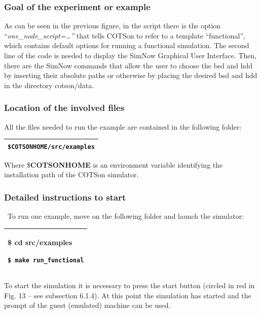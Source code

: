 \documentclass[a4paper]{article}
\begin{document}
\subsubsection[Goal of the experiment or example]{\rmfamily Goal of the
experiment or example}
{
As can be seen in the previous figure, in the script there is the option
{\textquotedblleft}\textit{one\_node\_script={\dots}{\textquotedblright}}
that tells COTSon to refer to a template
{\textquotedblleft}functional{\textquotedblright}, which contains
default options for running a functional simulation. The second line of
the code is needed to display the SimNow Graphical User Interface.
Then, there are the SimNow commands that allow the user to choose the
bsd and hdd by inserting their absolute paths or otherwise by placing
the desired bsd and hdd in the directory cotson/data.}

\subsubsection[Location of the involved files]{\rmfamily Location of the
involved files}
{
All the files needed to run the example are contained in the following
folder:}

\begin{flushleft}
\tablehead{}
\begin{supertabular}{|m{6.21846in}|}
\hline
{}
\texttt{\$COTSONHOME}\foreignlanguage{english}{\texttt{/src/examples}}\\\hline
\end{supertabular}
\end{flushleft}
{
Where \$\textbf{COTSONHOME }is an environment variable identifying the
installation path of the COTSon simulator.}

\subsubsection[Detailed instructions to start]{\rmfamily Detailed
instructions to start}
{
\ To run one example, move on the following folder and launch the
simulator:}

\begin{flushleft}
\tablehead{}
\begin{supertabular}{|m{6.21846in}|}
\hline
{\ttfamily \$ cd src/examples}

 \texttt{\$ make run\_functional}\\\hline
\end{supertabular}
\end{flushleft}
{
To start the simulation it is necessary to press the start button
(circled in red in Fig. 13 -- see subsection 6.1.4). At this point the
simulation has started and the prompt of the guest (emulated) machine
can be used. }
\end{document}
